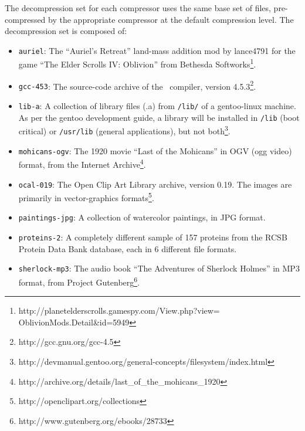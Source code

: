 The decompression set for each compressor uses the same base set of files, pre-compressed by the appropriate compressor at the default compression level.  The decompression set is composed of:
\begin{itemize}
\item {\tt auriel}: The ``Auriel's Retreat'' land-mass addition mod by lance4791 for the game ``The Elder Scrolls IV: Oblivion'' from Bethesda Softworks\footnote{http://planetelderscrolls.gamespy.com/View.php?view=\\ \hspace*{150 pt}OblivionMods.Detail\&id=5949}.

\item {\tt gcc-453}: The source-code archive of the \gcc\ compiler, version 4.5.3\footnote{http://gcc.gnu.org/gcc-4.5}.

\item {\tt lib-a}: A collection of library files (.a) from {\tt /lib/} of a gentoo-linux machine.  As per the gentoo development guide, a library will be installed in {\tt /lib} (boot critical) or {\tt /usr/lib} (general applications), but not both\footnote{http://devmanual.gentoo.org/general-concepts/filesystem/index.html}.

\item {\tt mohicans-ogv}: The 1920 movie ``Last of the Mohicans'' in OGV (ogg video) format, from the Internet Archive\footnote{http://archive.org/details/last\_of\_the\_mohicans\_1920}.

\item {\tt ocal-019}: The Open Clip Art Library archive, version 0.19. The images are primarily in vector-graphics formats\footnote{http://openclipart.org/collections}.

\item {\tt paintings-jpg}: A collection of watercolor paintings, in JPG format.

\item {\tt proteins-2}: A completely different sample of 157 proteins from the RCSB Protein Data Bank database, each in 6 different file formats.

\item {\tt sherlock-mp3}: The audio book ``The Adventures of Sherlock Holmes'' in MP3 format, from Project Gutenberg\footnote{http://www.gutenberg.org/ebooks/28733}.

\end{itemize}


